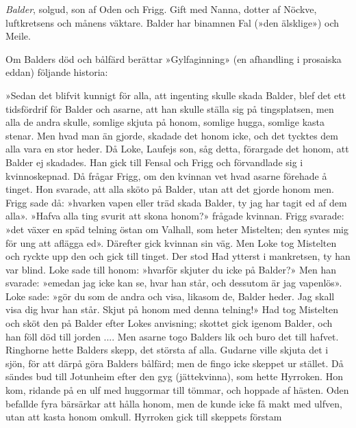 \emph{Balder}, solgud, son af Oden och Frigg. Gift med Nanna, dotter af
Nöckve, luftkretsens och månens väktare. Balder har binamnen Fal (»den
älsklige») och Meile.

Om Balders död och bålfärd berättar »Gylfaginning» (en afhandling i
prosaiska eddan) följande historia:

»Sedan det blifvit kunnigt för alla, att ingenting skulle skada Balder,
blef det ett tidsfördrif för Balder och asarne, att han skulle ställa
sig på tingsplatsen, men alla de andra skulle, somlige skjuta på honom,
somlige hugga, somlige kasta stenar. Men hvad man än gjorde, skadade det
honom icke, och det tycktes dem alla vara en stor heder. Då Loke,
Laufejs son, såg detta, förargade det honom, att Balder ej
skadades\protect\hypertarget{lb1625905.xhtmlux5cux23start205}{}{}\protect\hypertarget{lb1625905.xhtmlux5cux23start205-a}{}{}\protect\hypertarget{lb1625905.xhtmlux5cux23start205-b}{}{}\protect\hypertarget{lb1625905.xhtmlux5cux23start205-c}{}{}\protect\hypertarget{lb1625905.xhtmlux5cux23start205-d}{}{}.
Han gick till Fensal och Frigg och förvandlade sig i kvinnoskepnad. Då
frågar Frigg, om den kvinnan vet hvad asarne förehade å tinget. Hon
svarade, att alla sköto på Balder, utan att det gjorde honom men. Frigg
sade då: »hvarken vapen eller träd skada Balder, ty jag har tagit ed af
dem alla». »Hafva alla ting svurit att skona honom?» frågade kvinnan.
Frigg svarade: »det växer en späd telning östan om Valhall, som heter
Mistelten; den syntes mig för ung att aflägga ed». Därefter gick kvinnan
sin väg. Men Loke tog Mistelten och ryckte upp den och gick till tinget.
Der stod Had ytterst i mankretsen, ty han var blind. Loke sade till
honom: »hvarför skjuter du icke på Balder?» Men han svarade: »emedan jag
icke kan se, hvar han står, och dessutom är jag vapenlös». Loke sade:
»gör du som de andra och visa, likasom de, Balder heder. Jag skall visa
dig hvar han står. Skjut på honom med denna telning!» Had tog Mistelten
och sköt den på Balder efter Lokes anvisning; skottet gick igenom
Balder, och han föll död till jorden .... Men asarne togo Balders lik
och buro det till hafvet. Ringhorne hette Balders skepp, det största af
alla. Gudarne ville skjuta det i sjön, för att därpå göra Balders
bålfärd; men de fingo icke skeppet ur stället. Då sändes bud till
Jotunheim efter den gyg (jättekvinna), som hette Hyrroken. Hon kom,
ridande på en ulf med huggormar till tömmar, och hoppade af hästen. Oden
befallde fyra bärsärkar att hålla honom, men de kunde icke få makt med
ulfven, utan att kasta honom omkull. Hyrroken gick till skeppets förstam
